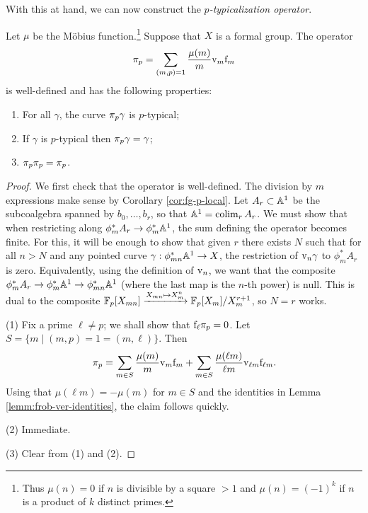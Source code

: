 With this at hand, we can now construct the \emph{$p$-typicalization operator}.
\begin{lemma} \label{lemm:p-typicalization}
Let $\mu$ be the Möbius function.\footnote{Thus $\mu(n) = 0$ if $n$ is divisible by a square $>1$ and $\mu(n) = (-1)^k$ if $n$ is a product of $k$ distinct primes.}
Suppose that $X$ is a formal group.
The operator
\[
\mathrm \pi_p = \sum_{(m,p)=1} \frac{\mu(m)}{m} \mathrm v_m \mathrm f_m
\]
is well-defined and has the following properties:
\begin{enumerate}
\item For all $\gamma$, the curve $\mathrm \pi_p \gamma$ is $p$-typical;
\item If $\gamma$ is $p$-typical then $\mathrm \pi_p \gamma=\gamma$;
\item $\mathrm \pi_p \mathrm \pi_p =\mathrm \pi_p$.
\end{enumerate}
\end{lemma}
\begin{proof}
We first check that the operator is well-defined.
The division by $m$ expressions make sense by Corollary \ref{cor:fg-p-local}.
Let $A_r \subset \mathbb A^1$ be the subcoalgebra spanned by $b_0,\dots,b_r$, so that $\mathbb A^1 = \operatorname*{colim}_r A_r$.
We must show that when restricting along $\phi_m^* A_r \to \phi_m^* \mathbb A^1$, the sum defining the operator becomes finite.
For this, it will be enough to show that given $r$ there exists $N$ such that for all $n>N$ and any pointed curve $\gamma: \phi_{mn}^* \mathbb A^1 \to X$, the restriction of $\mathrm v_n \gamma$ to $\phi_m^* A_r$ is zero.
Equivalently, using the definition of $\mathrm v_n$, we want that the composite $\phi_m^* A_r \to \phi_m^* \mathbb A^1 \to \phi_{mn}^* \mathbb A^1$ (where the last map is the $n$-th power) is null.
This is dual to the composite $\mathbb{F}_p[X_{mn}] \xrightarrow{X_{mn} \mapsto X_m^n} \mathbb{F}_p[X_m]/X_m^{r+1}$, so $N=r$ works.


(1) Fix a prime $\ell \ne p$; we shall show that $\mathrm f_\ell \mathrm \pi_p = 0$.
Let $S = \{m \mid (m,p) = 1 = (m,\ell)\}$.
Then \[ \mathrm \pi_p = \sum_{m \in S} \frac{\mu(m)}{m} \mathrm v_m \mathrm f_m + \sum_{m \in S} \frac{\mu(\ell m)}{\ell m} \mathrm v_{\ell m} \mathrm f_{\ell m}. \]
Using that $\mu(\ell m) = -\mu(m)$ for $m \in S$ and the identities in Lemma \ref{lemm:frob-ver-identities}, the claim follows quickly.

(2) Immediate.

(3) Clear from (1) and (2).
\end{proof}

